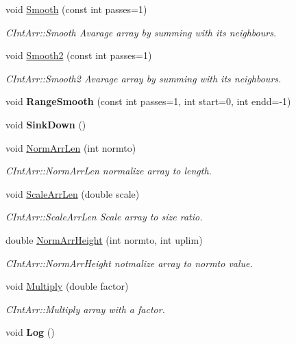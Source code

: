 \begin{DoxyCompactItemize}
\item 
void \hyperlink{class_c_int_arr_rec_aa6072ebf6b83180df6685c2c17332e6c}{Smooth} (const int passes=1)
\begin{DoxyCompactList}\small\item\em C\-Int\-Arr\-::\-Smooth Avarage array by summing with its neighbours. \end{DoxyCompactList}\item 
void \hyperlink{class_c_int_arr_rec_ad14564e2d17818e8b636cffee522aa7d}{Smooth2} (const int passes=1)
\begin{DoxyCompactList}\small\item\em C\-Int\-Arr\-::\-Smooth2 Avarage array by summing with its neighbours. \end{DoxyCompactList}\item 
\hypertarget{class_c_int_arr_rec_abb8aa977affddc47fe20387cdfb30aca}{void {\bfseries Range\-Smooth} (const int passes=1, int start=0, int endd=-\/1)}\label{class_c_int_arr_rec_abb8aa977affddc47fe20387cdfb30aca}

\item 
\hypertarget{class_c_int_arr_rec_a7fec5983dccb97cfcbe0d7e596a449bd}{void {\bfseries Sink\-Down} ()}\label{class_c_int_arr_rec_a7fec5983dccb97cfcbe0d7e596a449bd}

\item 
void \hyperlink{class_c_int_arr_rec_a56fbb92567de4289c3614543b3ef3d10}{Norm\-Arr\-Len} (int normto)
\begin{DoxyCompactList}\small\item\em C\-Int\-Arr\-::\-Norm\-Arr\-Len normalize array to length. \end{DoxyCompactList}\item 
void \hyperlink{class_c_int_arr_rec_a4acf9698f14a9440df169a207e08c8f9}{Scale\-Arr\-Len} (double scale)
\begin{DoxyCompactList}\small\item\em C\-Int\-Arr\-::\-Scale\-Arr\-Len Scale array to size ratio. \end{DoxyCompactList}\item 
double \hyperlink{class_c_int_arr_rec_a83d5e55a61dcac02abc518a78467929a}{Norm\-Arr\-Height} (int normto, int uplim)
\begin{DoxyCompactList}\small\item\em C\-Int\-Arr\-::\-Norm\-Arr\-Height notmalize array to normto value. \end{DoxyCompactList}\item 
void \hyperlink{class_c_int_arr_rec_a8262ff45cc881881df3ddfca0bda71d7}{Multiply} (double factor)
\begin{DoxyCompactList}\small\item\em C\-Int\-Arr\-::\-Multiply array with a factor. \end{DoxyCompactList}\item 
\hypertarget{class_c_int_arr_rec_aa624fa9a3af35d039716e183ac80f4c0}{void {\bfseries Log} ()}\label{class_c_int_arr_rec_aa624fa9a3af35d039716e183ac80f4c0}


\end{DoxyCompactItemize}
